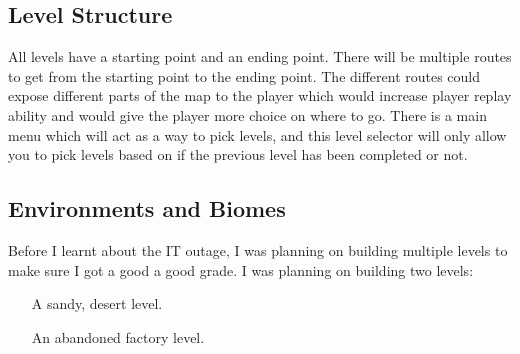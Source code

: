 \documentclass[12pt]{article}
\begin{document}
	\subsection{Level Structure}
	All levels have a starting point and an ending point. There will be multiple routes to get from the starting point to the ending point. The different routes could expose different parts of the map to the player which would increase player replay ability and would give the player more choice on where to go. There is a main menu which will act as a way to pick levels, and this level selector will only allow you to pick levels based on if the previous level has been completed or not.


	\subsection{Environments and Biomes}
	Before I learnt about the IT outage, I was planning on building multiple levels to make sure I got a good a good grade. I was planning on building two levels:
	\begin{itemize}
	  \item [A sandy, desert level.]
	  \item [An abandoned factory level.]
	\end{itemize}
	\newpage
	{\setlength{\parskip}{0pt}%
	
	}
	
\end{document}
